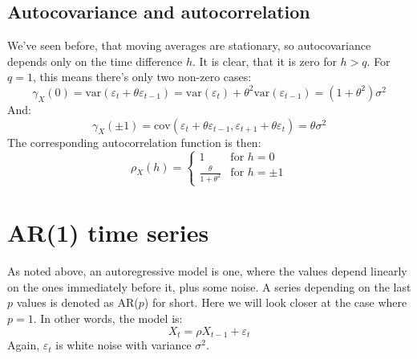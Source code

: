 \documentclass[12pt, a4paper]{article}
\numberwithin{equation}{section}
\begin{document}
\subsection{Autocovariance and autocorrelation}
We've seen before, that moving averages are stationary, so autocovariance depends only on the time difference $h$. It is clear, that it is zero for $h>q$. For $q=1$, this means there's only two non-zero cases:
\begin{equation}
\gamma_X(0)=\textrm{var}(\varepsilon_t+\theta\varepsilon_{t-1})=\textrm{var}(\varepsilon_t)+\theta^2\textrm{var}(\varepsilon_{t-1})=(1+\theta^2)\sigma^2
\end{equation}
And:
\begin{equation}
\gamma_X(\pm 1)=\textrm{cov}(\varepsilon_t+\theta\varepsilon_{t-1},\varepsilon_{t+1}+\theta\varepsilon_t)=\theta\sigma^2
\end{equation}
The corresponding autocorrelation function is then:
\begin{equation}
\rho_X(h)=
\begin{cases}
1 & \textrm{for }h=0 \\
\frac{\theta}{1+\theta^2} & \textrm{for }h=\pm 1
\end{cases}
\end{equation}


\section{AR(1) time series}
As noted above, an autoregressive model is one, where the values depend linearly on the ones immediately before it, plus some noise. A series depending on the last $p$ values is denoted as AR($p$) for short. Here we will look closer at the case where $p=1$. In other words, the model is:
\begin{equation}
\label{AR1}
X_t=\rho X_{t-1}+\varepsilon_t
\end{equation}
Again, $\varepsilon_t$ is white noise with variance $\sigma^2$.
\end{document}
